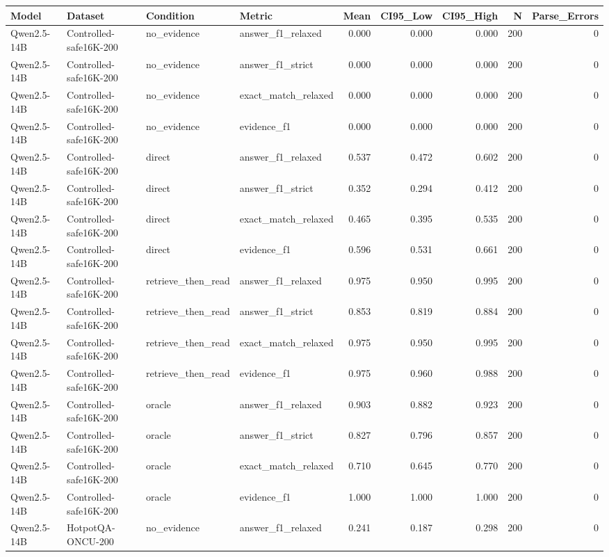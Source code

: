 \begin{tabular}{llllrrrrr}
\toprule
Model & Dataset & Condition & Metric & Mean & CI95_Low & CI95_High & N & Parse_Errors \\
\midrule
Qwen2.5-14B & Controlled-safe16K-200 & no_evidence & answer_f1_relaxed & 0.000 & 0.000 & 0.000 & 200 & 0 \\
Qwen2.5-14B & Controlled-safe16K-200 & no_evidence & answer_f1_strict & 0.000 & 0.000 & 0.000 & 200 & 0 \\
Qwen2.5-14B & Controlled-safe16K-200 & no_evidence & exact_match_relaxed & 0.000 & 0.000 & 0.000 & 200 & 0 \\
Qwen2.5-14B & Controlled-safe16K-200 & no_evidence & evidence_f1 & 0.000 & 0.000 & 0.000 & 200 & 0 \\
Qwen2.5-14B & Controlled-safe16K-200 & direct & answer_f1_relaxed & 0.537 & 0.472 & 0.602 & 200 & 0 \\
Qwen2.5-14B & Controlled-safe16K-200 & direct & answer_f1_strict & 0.352 & 0.294 & 0.412 & 200 & 0 \\
Qwen2.5-14B & Controlled-safe16K-200 & direct & exact_match_relaxed & 0.465 & 0.395 & 0.535 & 200 & 0 \\
Qwen2.5-14B & Controlled-safe16K-200 & direct & evidence_f1 & 0.596 & 0.531 & 0.661 & 200 & 0 \\
Qwen2.5-14B & Controlled-safe16K-200 & retrieve_then_read & answer_f1_relaxed & 0.975 & 0.950 & 0.995 & 200 & 0 \\
Qwen2.5-14B & Controlled-safe16K-200 & retrieve_then_read & answer_f1_strict & 0.853 & 0.819 & 0.884 & 200 & 0 \\
Qwen2.5-14B & Controlled-safe16K-200 & retrieve_then_read & exact_match_relaxed & 0.975 & 0.950 & 0.995 & 200 & 0 \\
Qwen2.5-14B & Controlled-safe16K-200 & retrieve_then_read & evidence_f1 & 0.975 & 0.960 & 0.988 & 200 & 0 \\
Qwen2.5-14B & Controlled-safe16K-200 & oracle & answer_f1_relaxed & 0.903 & 0.882 & 0.923 & 200 & 0 \\
Qwen2.5-14B & Controlled-safe16K-200 & oracle & answer_f1_strict & 0.827 & 0.796 & 0.857 & 200 & 0 \\
Qwen2.5-14B & Controlled-safe16K-200 & oracle & exact_match_relaxed & 0.710 & 0.645 & 0.770 & 200 & 0 \\
Qwen2.5-14B & Controlled-safe16K-200 & oracle & evidence_f1 & 1.000 & 1.000 & 1.000 & 200 & 0 \\
Qwen2.5-14B & HotpotQA-ONCU-200 & no_evidence & answer_f1_relaxed & 0.241 & 0.187 & 0.298 & 200 & 0 \\

\end{tabular}
